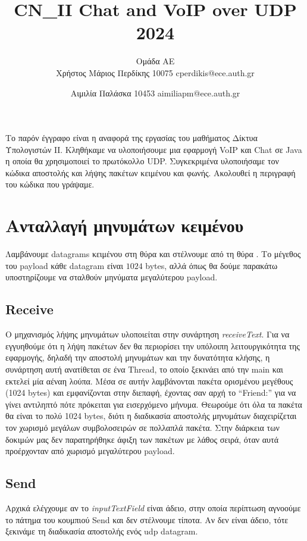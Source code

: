 \documentclass{article}
\title{CN\_II Chat and VoIP over UDP 2024}
\author{\vspace{6pt}Ομάδα ΑΕ\\ 
    Χρήστος Μάριος Περδίκης 10075 cperdikis@ece.auth.gr
   \and Αιμιλία Παλάσκα 10453 aimiliapm@ece.auth.gr}
\date{}
\begin{document}
\maketitle

Το παρόν έγγραφο είναι η αναφορά της εργασίας του μαθήματος Δίκτυα Υπολογιστών 
ΙΙ. Κληθήκαμε να υλοποιήσουμε μια εφαρμογή VoIP και Chat σε Java η οποία θα
χρησιμοποιεί το πρωτόκολλο UDP. Συγκεκριμένα υλοποιήσαμε τον κώδικα αποστολής 
και λήψης πακέτων κειμένου και φωνής. Ακολουθεί η περιγραφή του κώδικα που γράψαμε.

\section{Ανταλλαγή μηνυμάτων κειμένου}
Λαμβάνουμε datagrams κειμένου στη θύρα \textdestport{} και στέλνουμε από τη θύρα 
\textdestport. Το μέγεθος του payload κάθε datagram είναι $1024$ bytes, αλλά όπως θα 
δούμε παρακάτω υποστηρίζουμε να σταλθούν μηνύματα μεγαλύτερου payload.

\subsection{Receive}
Ο μηχανισμός λήψης μηνυμάτων υλοποιείται στην συνάρτηση \textit{receiveText}.
Για να εγγυηθούμε ότι η λήψη πακέτων δεν θα περιορίσει την υπόλοιπη λειτουργικότητα της
εφαρμογής, δηλαδή την αποστολή μηνυμάτων και την δυνατότητα κλήσης, η συνάρτηση αυτή
ανατίθεται σε ένα Thread, το οποίο ξεκινάει από την main και εκτελεί μία αέναη λούπα. 
Μέσα σε αυτήν λαμβάνονται πακέτα ορισμένου μεγέθους (1024 bytes) και εμφανίζονται στην
διεπαφή, έχοντας σαν αρχή το ``Friend:'' για να γίνει αντιληπτό πότε πρόκειται για εισερχόμενο
μήνυμα. Θεωρούμε ότι όλα τα πακέτα θα είναι το πολύ 1024 bytes, διότι η διαδικασία
αποστολής μηνυμάτων διαχειρίζεται τον χωρισμό μεγάλων συμβολοσειρών σε πολλαπλά πακέτα.
Στην διάρκεια των δοκιμών μας δεν παρατηρήθηκε άφιξη των πακέτων με λάθος σειρά, όταν αυτά
προέρχονταν από χωρισμό μεγαλύτερου payload. 

\subsection{Send}
Αρχικά ελέγχουμε αν το \textit{inputTextField} είναι άδειο, στην οποία 
περίπτωση αγνοούμε το πάτημα του κουμπιού Send και δεν στέλνουμε τίποτα. 
Αν δεν είναι άδειο, τότε ξεκινάμε τη διαδικασία αποστολής ενός udp datagram.
\end{document}
